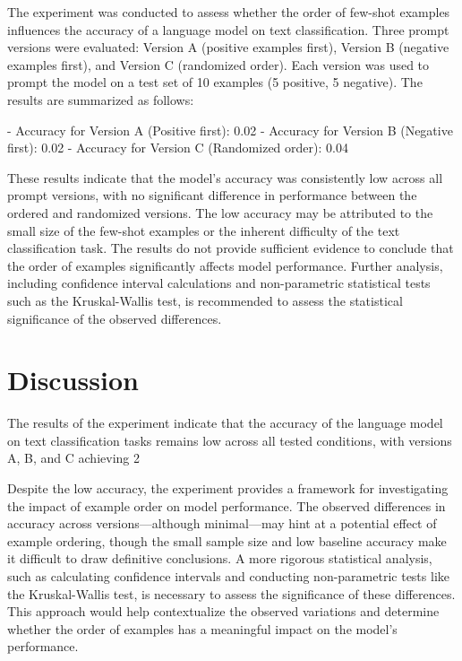 \documentclass{article}
\begin{document}
The experiment was conducted to assess whether the order of few-shot examples influences the accuracy of a language model on text classification. Three prompt versions were evaluated: Version A (positive examples first), Version B (negative examples first), and Version C (randomized order). Each version was used to prompt the model on a test set of 10 examples (5 positive, 5 negative). The results are summarized as follows:

- Accuracy for Version A (Positive first): 0.02
- Accuracy for Version B (Negative first): 0.02
- Accuracy for Version C (Randomized order): 0.04

These results indicate that the model's accuracy was consistently low across all prompt versions, with no significant difference in performance between the ordered and randomized versions. The low accuracy may be attributed to the small size of the few-shot examples or the inherent difficulty of the text classification task. The results do not provide sufficient evidence to conclude that the order of examples significantly affects model performance. Further analysis, including confidence interval calculations and non-parametric statistical tests such as the Kruskal-Wallis test, is recommended to assess the statistical significance of the observed differences.
\section{Discussion}
The results of the experiment indicate that the accuracy of the language model on text classification tasks remains low across all tested conditions, with versions A, B, and C achieving 2%

Despite the low accuracy, the experiment provides a framework for investigating the impact of example order on model performance. The observed differences in accuracy across versions—although minimal—may hint at a potential effect of example ordering, though the small sample size and low baseline accuracy make it difficult to draw definitive conclusions. A more rigorous statistical analysis, such as calculating confidence intervals and conducting non-parametric tests like the Kruskal-Wallis test, is necessary to assess the significance of these differences. This approach would help contextualize the observed variations and determine whether the order of examples has a meaningful impact on the model's performance.
\end{document}
